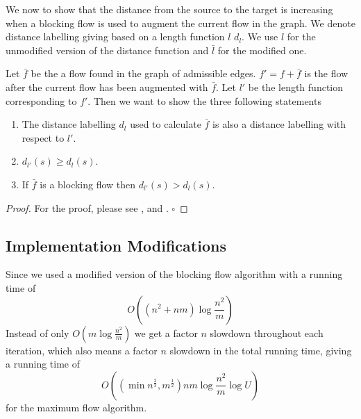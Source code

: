 We now to show that the distance from the source to the target is increasing when a blocking flow is used to augment the current flow in the graph.
We denote distance labelling giving based on a length function $l$ $d_l$. We use $l$ for the unmodified version of the distance function and $\bar{l}$ for
the modified one.
\begin{theorem}
	Let $\bar{f}$ be the a flow found in the graph of admissible edges. $f' = f + \bar{f}$ is the flow after the current flow has been augmented with $\bar{f}$.
	Let $l'$ be the length function corresponding to $f'$. Then we want to show the three following statements
	\begin{enumerate}
		\item The distance labelling $d_l$ used to calculate $\bar{f}$ is also a distance labelling with respect to $l'$.
		\item $d_{l'}(s) \geq d_{l}(s)$.
		\item If $\bar{f}$ is a blocking flow then $d_{l'}(s) > d_{l}(s)$.
	\end{enumerate}
\end{theorem}
\begin{proof}
	For the proof, please see \cite[Lemma 4.1]{Goldberg1998}, \cite[Corollary 4.2]{Goldberg1998} and \cite[Theorem 4.3]{Goldberg1998}.
	$\square$
\end{proof}

\subsection{Implementation Modifications} \label{GR-IM}

Since we used a modified version of the blocking flow algorithm with a running time of $$O\left((n^2 + nm)\log{\frac{n^2}{m}}\right)$$ 
Instead of only $O(m\log{\frac{n^2}{m}})$ we get a factor $n$ slowdown throughout each iteration, which also means a factor $n$ slowdown in the
total running time, giving a running time of $$O\left(\left(\min{n^{\frac{2}{3}},m^{\frac{1}{2}}}\right)nm\log{\frac{n^2}{m}}\log{U}\right)$$
for the maximum flow algorithm.

